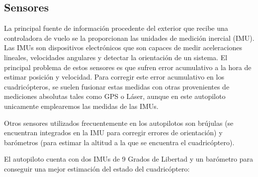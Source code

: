 \subsection{Sensores}
La principal fuente de información procedente del exterior que recibe una controladora de vuelo se la proporcionan las unidades de medición inercial (IMU). Las IMUs son dispositivos electrónicos que son capaces de medir aceleraciones lineales, velocidades angulares y detectar la orientación de un sistema. El principal problema de estos sensores es que sufren error acumulativo a la hora de estimar posición y velocidad. Para corregir este error acumulativo en los cuadricópteros, se suelen fusionar estas medidas con otras provenientes de mediciones absolutas tales como GPS o Láser, aunque en este autopiloto unicamente emplearemos las medidas de las IMUs.

\par Otros sensores utilizados frecuentemente en los autopilotos son brújulas (se encuentran integrados en la IMU para corregir errores de orientación) y barómetros (para estimar la altitud a la que se encuentra el cuadricóptero).\\
\medskip

El autopiloto cuenta con dos IMUs de 9 Grados de Libertad y un barómetro para conseguir una mejor estimación del estado del cuadricóptero:

